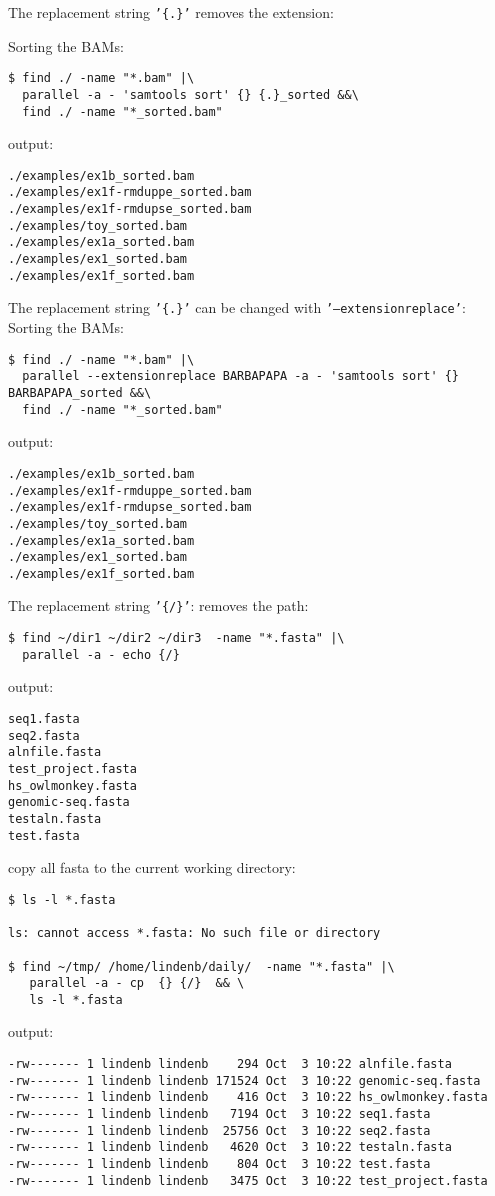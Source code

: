 \documentclass{article}
\begin{document}
The replacement string  \texttt{'\{.\}'} removes the extension:

Sorting the BAMs:
\begin{lstlisting}
$ find ./ -name "*.bam" |\
  parallel -a - 'samtools sort' {} {.}_sorted &&\
  find ./ -name "*_sorted.bam"
\end{lstlisting}
output:
\begin{lstlisting}
./examples/ex1b_sorted.bam
./examples/ex1f-rmduppe_sorted.bam
./examples/ex1f-rmdupse_sorted.bam
./examples/toy_sorted.bam
./examples/ex1a_sorted.bam
./examples/ex1_sorted.bam
./examples/ex1f_sorted.bam
\end{lstlisting}

The replacement string \texttt{'\{.\}'} can be changed with  \texttt{'--extensionreplace'}:
Sorting the BAMs:
\begin{lstlisting}
$ find ./ -name "*.bam" |\
  parallel --extensionreplace BARBAPAPA -a - 'samtools sort' {} BARBAPAPA_sorted &&\
  find ./ -name "*_sorted.bam"
\end{lstlisting}
output:
\begin{lstlisting}
./examples/ex1b_sorted.bam
./examples/ex1f-rmduppe_sorted.bam
./examples/ex1f-rmdupse_sorted.bam
./examples/toy_sorted.bam
./examples/ex1a_sorted.bam
./examples/ex1_sorted.bam
./examples/ex1f_sorted.bam
\end{lstlisting}



The replacement string \texttt{'\{/\}'}: removes the path:
\begin{lstlisting}
$ find ~/dir1 ~/dir2 ~/dir3  -name "*.fasta" |\
  parallel -a - echo {/}
\end{lstlisting}
output:
\begin{lstlisting}
seq1.fasta
seq2.fasta
alnfile.fasta
test_project.fasta
hs_owlmonkey.fasta
genomic-seq.fasta
testaln.fasta
test.fasta
\end{lstlisting}

copy all fasta to the current working directory:

\begin{lstlisting}
$ ls -l *.fasta

ls: cannot access *.fasta: No such file or directory

$ find ~/tmp/ /home/lindenb/daily/  -name "*.fasta" |\
   parallel -a - cp  {} {/}  && \
   ls -l *.fasta
\end{lstlisting}
output:
\begin{lstlisting}
-rw------- 1 lindenb lindenb    294 Oct  3 10:22 alnfile.fasta
-rw------- 1 lindenb lindenb 171524 Oct  3 10:22 genomic-seq.fasta
-rw------- 1 lindenb lindenb    416 Oct  3 10:22 hs_owlmonkey.fasta
-rw------- 1 lindenb lindenb   7194 Oct  3 10:22 seq1.fasta
-rw------- 1 lindenb lindenb  25756 Oct  3 10:22 seq2.fasta
-rw------- 1 lindenb lindenb   4620 Oct  3 10:22 testaln.fasta
-rw------- 1 lindenb lindenb    804 Oct  3 10:22 test.fasta
-rw------- 1 lindenb lindenb   3475 Oct  3 10:22 test_project.fasta
\end{lstlisting}
\end{document}
